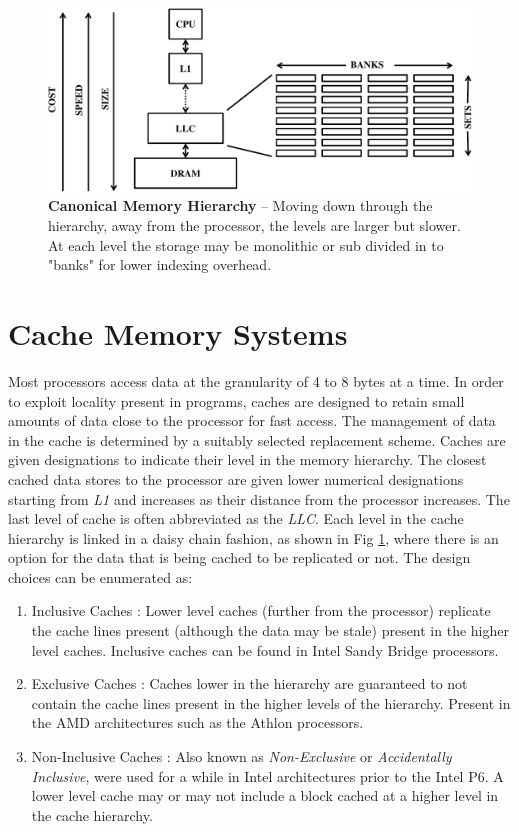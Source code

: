 \begin{figure}[h]
  \begin{center}
    \includegraphics[width=\textwidth]{files/Figures/05-MemoryHierarchy.pdf}
    \caption[Canonical Memory Hierarchy]{\textbf{Canonical Memory Hierarchy} -- Moving down through the hierarchy, away from the processor, the levels are larger but slower. At each level the storage may be monolithic or sub divided in to "banks" for lower indexing overhead.}
    \label{fig:memory_hierarchy}
  \end{center}
\end{figure}

\section{Cache Memory Systems}
\label{sec:cache_memory_systems}
Most processors access data at the granularity of 4 to 8 bytes at a time. In order to exploit locality present in programs, caches are designed to retain small amounts of data close to the processor for fast access. The management of data in the cache is determined by a suitably selected replacement scheme. Caches are given designations to indicate their level in the memory hierarchy. The closest cached data stores to the processor are given lower numerical designations starting from \textit{L1} and increases as their distance from the processor increases. The last level of cache is often abbreviated as the \textit{LLC}. Each level in the cache hierarchy is linked in a daisy chain fashion, as shown in Fig \ref{fig:memory_hierarchy}, where there is an option for the data that is being cached to be replicated or not. The design choices can be enumerated as:

\begin{enumerate}
  \item Inclusive Caches : Lower level caches (further from the processor) replicate the cache lines present (although the data may be stale) present in the higher level caches. Inclusive caches can be found in Intel Sandy Bridge processors.
  \item Exclusive Caches : Caches lower in the hierarchy are guaranteed to not contain the cache lines present in the higher levels of the hierarchy. Present in the AMD architectures such as the Athlon processors.
  \item Non-Inclusive Caches : Also known as \textit{Non-Exclusive} or \textit{Accidentally Inclusive}, were used for a while in Intel architectures prior to the Intel P6. A lower level cache may or may not include a block cached at a higher level in the cache hierarchy.
\end{enumerate}

